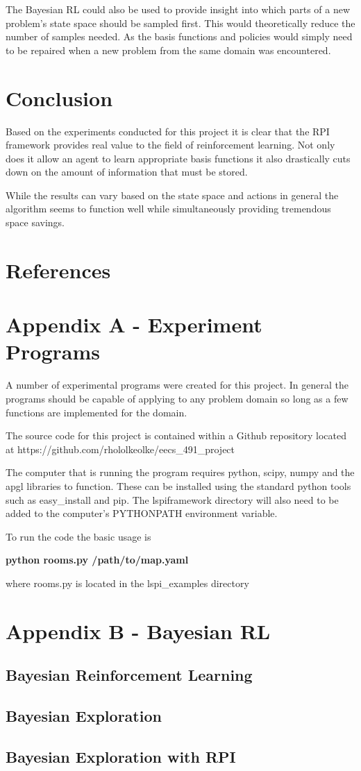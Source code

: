 \documentclass[12pt, letterpaper, final]{report}
\begin{document}
The Bayesian RL could also be used to provide insight into which parts
of a new problem's state space should be sampled first. This would
theoretically reduce the number of samples needed. As the basis
functions and policies would simply need to be repaired when a new
problem from the same domain was encountered.

\section{Conclusion}

Based on the experiments conducted for this project it is clear that
the RPI framework provides real value to the field of reinforcement
learning. Not only does it allow an agent to learn appropriate basis
functions it also drastically cuts down on the amount of information
that must be stored.

While the results can vary based on the state space and actions in
general the algorithm seems to function well while simultaneously
providing tremendous space savings.

\section{References}

\section{Appendix A - Experiment Programs}

A number of experimental programs were created for this project. In
general the programs should be capable of applying to any problem
domain so long as a few functions are implemented for the domain. 

The source code for this project is contained within a Github
repository located at https://github.com/rhololkeolke/eecs\_491\_project

The computer that is running the program requires python, scipy, numpy
and the apgl libraries to function. These can be installed using the
standard python tools such as easy\_install and pip.  The lspiframework directory will also need to be added to the
computer's PYTHONPATH environment variable.

To run the code the basic usage is 

\vspace{5 mm}
{\bf python rooms.py /path/to/map.yaml}
\vspace{5 mm}

where rooms.py is located in the lspi\_examples directory

\section{Appendix B - Bayesian RL}

\subsection*{Bayesian Reinforcement Learning}


\subsection*{Bayesian Exploration}

\subsection*{Bayesian Exploration with RPI}
\end{document}
